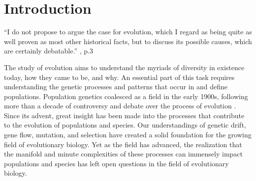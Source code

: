 \chapter{Introduction}
\label{chap:introduction}

\begin{quoteshrink}
  ``I do not propose to argue the case for evolution, which I regard as being quite as well proven as most other historical facts, but to discuss its possible causes, which are certainly debatable.''
  \hfill\citet{Haldane:1932}, p.3
\end{quoteshrink}

\noindent



The study of evolution aims to understand the myriads of diversity in existence today, how they came to be, and why. An essential part of this task requires understanding the genetic processes and patterns that occur in and define populations. Population genetics coalesced as a field in the early 1900s, following more than a decade of controversy and debate over the process of evolution \citep{Provine:2001}. Since its advent, great insight has been made into the processes that contribute to the evolution of populations and species. Our understandings of genetic drift, gene flow, mutation, and selection have created a solid foundation for the growing field of evolutionary biology. Yet as the field has advanced, the realization that the manifold and minute complexities of these processes can immensely impact populations and species has left open questions in the field of evolutionary biology.

